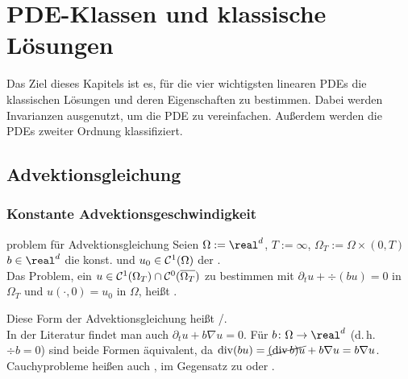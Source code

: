 \chapter{%
    PDE-Klassen und klassische Lösungen%
}

\begin{Bem}
    Das Ziel dieses Kapitels ist es, für die vier wichtigsten linearen PDEs die klassischen
    Lösungen und deren Eigenschaften zu bestimmen.
    Dabei werden Invarianzen ausgenutzt, um die PDE zu vereinfachen.
    Außerdem werden die PDEs zweiter Ordnung klassifiziert.
\end{Bem}

\section{%
    Advektionsgleichung%
}

\subsection{%
    Konstante Advektionsgeschwindigkeit%
}

\begin{Def}{problem für Advektionsgleichung}
    Seien $\Omega := \real^d$,
    $T := \infty$,
    $\Omega_T := \Omega \times (0, T)$
    $b \in \real^d$ die konst.  und
    $u_0 \in \C^1(\Omega)$ der .\\
    Das Problem, ein $u \in \C^1(\Omega_T) \cap \C^0(\overline{\Omega_T})$ zu bestimmen mit
    $\partial_t u + \div(bu) = 0$ in $\Omega_T$ und $u(\cdot, 0) = u_0$ in $\Omega$,
    heißt .
\end{Def}

\begin{Bem}
    Diese Form der Advektionsgleichung heißt /.\\
    In der Literatur findet man auch $\partial_t u + b \nabla u = 0$.
    Für $b\colon \Omega \to \real^d$  (d.\,h. $\div b = 0$)
    sind beide Formen äquivalent, da
    $\div(bu) = \cancel{(\div b) u} + b \nabla u = b \nabla u$.\\
    Cauchyprobleme heißen auch ,
    im Gegensatz zu  oder
    .
\end{Bem}

